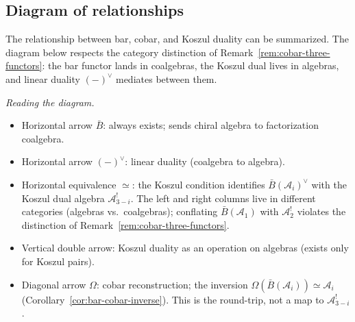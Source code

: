 \subsection{Diagram of relationships}

The relationship between bar, cobar, and Koszul duality can be summarized.
The diagram below respects the category distinction of
Remark~\ref{rem:cobar-three-functors}: the bar functor lands in
coalgebras, the Koszul dual lives in algebras, and linear duality
$(-)^\vee$ mediates between them.

\begin{center}
\end{center}

\emph{Reading the diagram.}
\begin{itemize}
\item Horizontal arrow $\bar{B}$: always exists; sends chiral algebra to
 factorization coalgebra.
\item Horizontal arrow $(-)^\vee$: linear duality (coalgebra to algebra).
\item Horizontal equivalence $\simeq$: the Koszul condition identifies
 $\bar{B}(\mathcal{A}_i)^\vee$ with the Koszul dual algebra
 $\mathcal{A}_{3-i}^!$. The left and right columns live in different
 categories (algebras vs.\ coalgebras); conflating
 $\bar{B}(\mathcal{A}_1)$ with $\mathcal{A}_2^!$ violates the
 distinction of Remark~\ref{rem:cobar-three-functors}.
\item Vertical double arrow: Koszul duality as an operation on
 algebras (exists only for Koszul pairs).
\item Diagonal arrow $\Omega$: cobar reconstruction; the inversion
 $\Omega(\bar{B}(\mathcal{A}_i)) \simeq \mathcal{A}_i$
 (Corollary~\ref{cor:bar-cobar-inverse}). This is the round-trip,
 not a map to $\mathcal{A}_{3-i}^!$.
\end{itemize}


